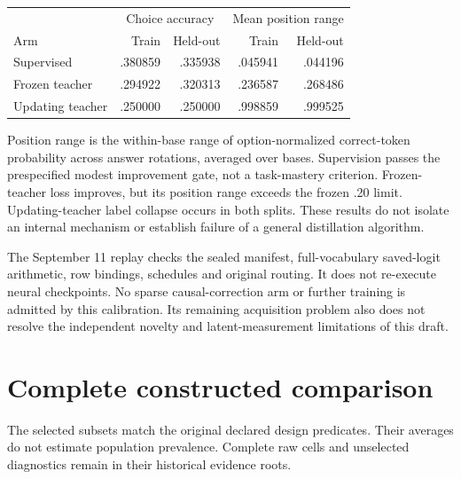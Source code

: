 \documentclass{article}
\begin{document}
\begin{center}
\begin{tabular}{lrrrr}
\toprule
& \multicolumn{2}{c}{Choice accuracy} & \multicolumn{2}{c}{Mean position range} \\
Arm & Train & Held-out & Train & Held-out \\
\midrule
Supervised & .380859 & .335938 & .045941 & .044196 \\
Frozen teacher & .294922 & .320313 & .236587 & .268486 \\
Updating teacher & .250000 & .250000 & .998859 & .999525 \\
\bottomrule
\end{tabular}
\end{center}
Position range is the within-base range of option-normalized correct-token
probability across answer rotations, averaged over bases. Supervision passes the prespecified
modest improvement gate, not a task-mastery criterion. Frozen-teacher loss
improves, but its position range exceeds the frozen .20 limit. Updating-teacher
label collapse occurs in both splits. These results do not isolate an internal
mechanism or establish failure of a general distillation algorithm.

The September 11 replay checks the sealed manifest, full-vocabulary saved-logit
arithmetic, row bindings, schedules and original routing. It does not re-execute
neural checkpoints. No sparse causal-correction arm or further training is
admitted by this calibration. Its remaining acquisition problem also does not
resolve the independent novelty and latent-measurement limitations of this draft.
\section{Complete constructed comparison}

The selected subsets match the original declared design predicates. Their
averages do not estimate population prevalence. Complete raw cells and
unselected diagnostics remain in their historical evidence roots.
\end{document}
